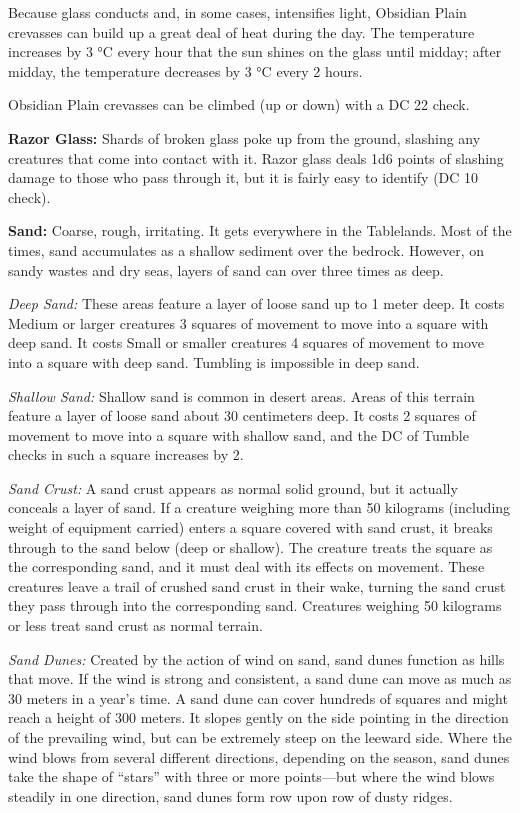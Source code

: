 Because glass conducts and, in some cases, intensifies light, Obsidian Plain crevasses can build up a great deal of heat during the day. The temperature increases by 3 °C every hour that the sun shines on the glass until midday; after midday, the temperature decreases by 3 °C every 2 hours.

Obsidian Plain crevasses can be climbed (up or down) with a DC 22  check.

\textbf{Razor Glass:} Shards of broken glass poke up from the ground, slashing any creatures that come into contact with it. Razor glass deals 1d6 points of slashing damage to those who pass through it, but it is fairly easy to identify (DC 10  check).


\textbf{Sand:} Coarse, rough, irritating. It gets everywhere in the Tablelands. Most of the times, sand accumulates as a shallow sediment over the bedrock. However, on sandy wastes and dry seas, layers of sand can over three times as deep.

\textit{Deep Sand:} These areas feature a layer of loose sand up to 1 meter deep. It costs Medium or larger creatures 3 squares of movement to move into a square with deep sand. It costs Small or smaller creatures 4 squares of movement to move into a square with deep sand. Tumbling is impossible in deep sand.

\textit{Shallow Sand:} Shallow sand is common in desert areas. Areas of this terrain feature a layer of loose sand about 30 centimeters deep. It costs 2 squares of movement to move into a square with shallow sand, and the DC of Tumble checks in such a square increases by 2.

\textit{Sand Crust:} A sand crust appears as normal solid ground, but it actually conceals a layer of sand. If a creature weighing more than 50 kilograms (including weight of equipment carried) enters a square covered with sand crust, it breaks through to the sand below (deep or shallow). The creature treats the square as the corresponding sand, and it must deal with its effects on movement. These creatures leave a trail of crushed sand crust in their wake, turning the sand crust they pass through into the corresponding sand. Creatures weighing 50 kilograms or less treat sand crust as normal terrain.

\textit{Sand Dunes:} Created by the action of wind on sand, sand dunes function as hills that move. If the wind is strong and consistent, a sand dune can move as much as 30 meters in a year's time. A sand dune can cover hundreds of squares and might reach a height of 300 meters. It slopes gently on the side pointing in the direction of the prevailing wind, but can be extremely steep on the leeward side. Where the wind blows from several different directions, depending on the season, sand dunes take the shape of ``stars'' with three or more points---but where the wind blows steadily in one direction, sand dunes form row upon row of dusty ridges.
